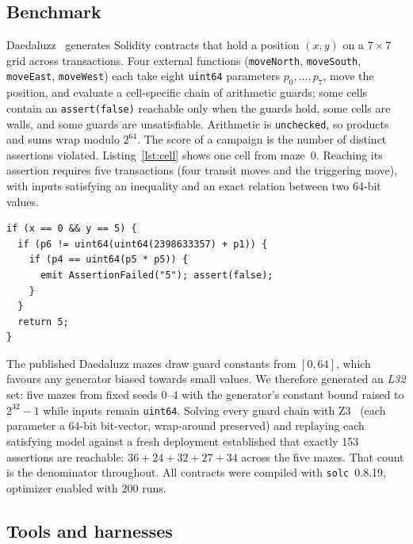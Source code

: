 \documentclass[11pt,a4paper]{article}
\begin{document}
\subsection{Benchmark}
\label{sec:benchmark}

Daedaluzz~\cite{daedaluzz2023} generates Solidity contracts that hold a position $(x,y)$ on a $7{\times}7$ grid across transactions. Four external functions (\texttt{moveNorth}, \texttt{moveSouth}, \texttt{moveEast}, \texttt{moveWest}) each take eight \texttt{uint64} parameters $p_0,\dots,p_7$, move the position, and evaluate a cell-specific chain of arithmetic guards; some cells contain an \texttt{assert(false)} reachable only when the guards hold, some cells are walls, and some guards are unsatisfiable. Arithmetic is \texttt{unchecked}, so products and sums wrap modulo $2^{64}$. The score of a campaign is the number of distinct assertions violated. Listing~\ref{lst:cell} shows one cell from maze~0. Reaching its assertion requires five transactions (four transit moves and the triggering move), with inputs satisfying an inequality and an exact relation between two 64-bit values.

\begin{lstlisting}[caption={Guard conditions and assertion at cell $(0,5)$ of L32 maze~0.},label={lst:cell}]
if (x == 0 && y == 5) {
  if (p6 != uint64(uint64(2398633357) + p1)) {
    if (p4 == uint64(p5 * p5)) {
      emit AssertionFailed("5"); assert(false);
    }
  }
  return 5;
}
\end{lstlisting}

The published Daedaluzz mazes draw guard constants from $[0,64]$, which favours any generator biased towards small values. We therefore generated an \emph{L32} set: five mazes from fixed seeds 0--4 with the generator's constant bound raised to $2^{32}-1$ while inputs remain \texttt{uint64}. Solving every guard chain with Z3~\cite{demoura2008z3} (each parameter a 64-bit bit-vector, wrap-around preserved) and replaying each satisfying model against a fresh deployment established that exactly 153 assertions are reachable: $36+24+32+27+34$ across the five mazes. That count is the denominator throughout. All contracts were compiled with \texttt{solc}~0.8.19, optimizer enabled with 200 runs.

\subsection{Tools and harnesses}
\label{sec:tools}
\end{document}

